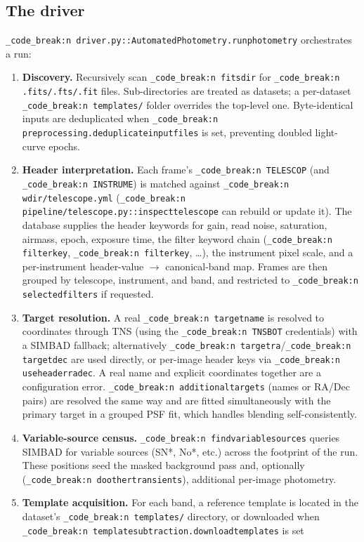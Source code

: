 \documentclass[11pt,a4paper]{article}
\renewcommand{\_}{\autophotunderscore\allowbreak}
\DeclareRobustCommand{\code}[1]{\texttt{\autophot_code_break:n {#1}}}
\begin{document}
\subsection{The driver}
\label{sec:driver}

\code{driver.py::AutomatedPhotometry.run\_photometry} orchestrates a run:

\begin{enumerate}[leftmargin=2em,itemsep=1pt]
\item \textbf{Discovery.} Recursively scan \code{fits\_dir} for
\code{.fits/.fts/.fit} files. Sub-directories are treated as datasets; a
per-dataset \code{templates/} folder overrides the top-level one.
Byte-identical inputs are deduplicated when
\code{preprocessing.deduplicate\_input\_files} is set, preventing doubled
light-curve epochs.
\item \textbf{Header interpretation.} Each frame's \code{TELESCOP} (and
\code{INSTRUME}) is matched against \code{wdir/telescope.yml}
(\code{pipeline/telescope.py::inspect\_telescope} can rebuild or update
it). The database supplies the header keywords for gain, read noise,
saturation, airmass, epoch, exposure time, the filter keyword chain
(\code{filter\_key\_0}, \code{filter\_key\_1}, \dots), the instrument
pixel scale, and a per-instrument header-value $\to$ canonical-band map.
Frames are then grouped by telescope, instrument, and band, and restricted
to \code{selected\_filters} if requested.
\item \textbf{Target resolution.} A real \code{target\_name} is resolved
to coordinates through TNS (using the \code{TNS\_BOT\_*} credentials) with
a SIMBAD fallback; alternatively \code{target\_ra}\slash\code{target\_dec} are
used directly, or per-image header keys via \code{use\_header\_radec}.
A real name and explicit coordinates together are a configuration error.
\code{additional\_targets} (names or RA/Dec pairs) are resolved the same
way and are fitted simultaneously with the primary target in a grouped
PSF fit, which handles blending self-consistently.
\item \textbf{Variable-source census.} \code{find\_variable\_sources}
queries SIMBAD for variable sources (SN*, No*, etc.) across the footprint
of the run. These positions seed the masked background pass and,
optionally (\code{do\_other\_transients}), additional per-image photometry.
\item \textbf{Template acquisition.} For each band, a reference template
is located in the dataset's \code{templates/} directory, or downloaded
when \code{template\_subtraction.download\_templates} is set

\end{enumerate}
\end{document}
